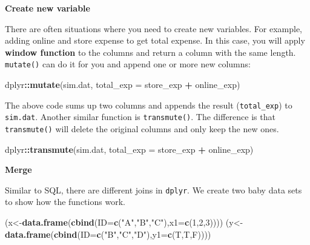 \documentclass[12pt,]{krantz}
\makeatletter
\newenvironment{Shaded}{\begin{snugshade}}{\end{snugshade}}
\newcommand{\KeywordTok}[1]{\textcolor[rgb]{0.27,0.27,0.27}{\textbf{#1}}}
\newcommand{\DataTypeTok}[1]{\textcolor[rgb]{0.27,0.27,0.27}{#1}}
\newcommand{\DecValTok}[1]{\textcolor[rgb]{0.06,0.06,0.06}{#1}}
\newcommand{\StringTok}[1]{\textcolor[rgb]{0.5,0.5,0.5}{#1}}
\newcommand{\OperatorTok}[1]{\textcolor[rgb]{0.43,0.43,0.43}{\textbf{#1}}}
\newcommand{\NormalTok}[1]{#1}
\newenvironment{kframe}{%
\medskip{}
\setlength{\fboxsep}{.8em}
 \def\at@end@of@kframe{}%
 \ifinner\ifhmode%
  \def\at@end@of@kframe{\end{minipage}}%
  \begin{minipage}{\columnwidth}%
 \fi\fi%
 \def\FrameCommand##1{\hskip\@totalleftmargin \hskip-\fboxsep
 \colorbox{shadecolor}{##1}\hskip-\fboxsep
     \hskip-\linewidth \hskip-\@totalleftmargin \hskip\columnwidth}%
 \MakeFramed {\advance\hsize-\width
   \@totalleftmargin\z@ \linewidth\hsize
   \@setminipage}}%
 {\par\unskip\endMakeFramed%
 \at@end@of@kframe}
\renewenvironment{Shaded}{\begin{kframe}}{\end{kframe}}
\theoremstyle{definition}
\theoremstyle{definition}
\theoremstyle{definition}
\theoremstyle{remark}
\makeatother
\begin{document}
\textbf{Create new variable}

There are often situations where you need to create new variables. For
example, adding online and store expense to get total expense. In this
case, you will apply \textbf{window function} to the columns and return
a column with the same length. \texttt{mutate()} can do it for you and
append one or more new columns:

\begin{Shaded}
\begin{Highlighting}[]
\NormalTok{dplyr}\OperatorTok{::}\KeywordTok{mutate}\NormalTok{(sim.dat, }\DataTypeTok{total_exp =}\NormalTok{ store_exp }\OperatorTok{+}\StringTok{ }\NormalTok{online_exp)}
\end{Highlighting}
\end{Shaded}

The above code sums up two columns and appends the result
(\texttt{total\_exp}) to \texttt{sim.dat}. Another similar function is
\texttt{transmute()}. The difference is that \texttt{transmute()} will
delete the original columns and only keep the new ones.

\begin{Shaded}
\begin{Highlighting}[]
\NormalTok{dplyr}\OperatorTok{::}\KeywordTok{transmute}\NormalTok{(sim.dat, }\DataTypeTok{total_exp =}\NormalTok{ store_exp }\OperatorTok{+}\StringTok{ }\NormalTok{online_exp) }
\end{Highlighting}
\end{Shaded}

\textbf{Merge}

Similar to SQL, there are different joins in \texttt{dplyr}. We create
two baby data sets to show how the functions work.

\begin{Shaded}
\begin{Highlighting}[]
\NormalTok{(x<-}\KeywordTok{data.frame}\NormalTok{(}\KeywordTok{cbind}\NormalTok{(}\DataTypeTok{ID=}\KeywordTok{c}\NormalTok{(}\StringTok{"A"}\NormalTok{,}\StringTok{"B"}\NormalTok{,}\StringTok{"C"}\NormalTok{),}\DataTypeTok{x1=}\KeywordTok{c}\NormalTok{(}\DecValTok{1}\NormalTok{,}\DecValTok{2}\NormalTok{,}\DecValTok{3}\NormalTok{))))}
\NormalTok{(y<-}\KeywordTok{data.frame}\NormalTok{(}\KeywordTok{cbind}\NormalTok{(}\DataTypeTok{ID=}\KeywordTok{c}\NormalTok{(}\StringTok{"B"}\NormalTok{,}\StringTok{"C"}\NormalTok{,}\StringTok{"D"}\NormalTok{),}\DataTypeTok{y1=}\KeywordTok{c}\NormalTok{(T,T,F))))}
\end{Highlighting}
\end{Shaded}
\end{document}

